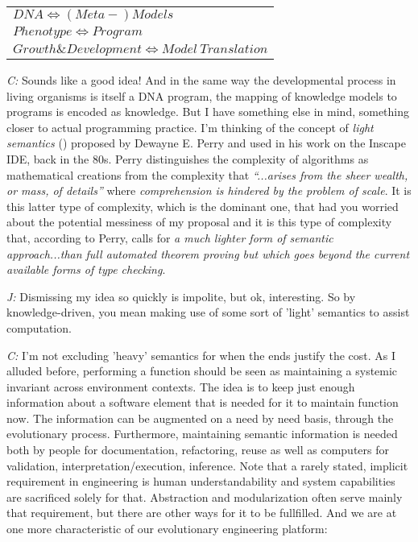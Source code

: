 \documentclass[10pt]{sigplanconf}
\begin{document}
\vspace{10pt}

\begin{tabular}{l}
$DNA \Longleftrightarrow (Meta-)Models$ \\
$Phenotype \Longleftrightarrow Program$ \\
$Growth\&Development \Longleftrightarrow Model~Translation$ \\
\end{tabular}

\vspace{10pt}

\emph{C:} Sounds like a good idea! And in the same way the developmental process in living organisms is itself a DNA program, the mapping of knowledge models to programs is encoded as knowledge. But I have something else in mind, something closer to actual programming practice. I'm thinking of the concept of \emph{light semantics} (\cite{perry1}) proposed by Dewayne E. Perry and used in his work on the Inscape IDE, back in the 80s. Perry distinguishes the complexity of algorithms as mathematical creations from the complexity that \emph{``...arises from the sheer wealth, or mass, of details''} where \emph{comprehension is hindered by the problem of scale}. It is this latter type of complexity, which is the dominant one, that had you worried about the potential messiness of my proposal and it is this type of complexity that, according to Perry, calls for \emph{a much lighter form of semantic approach...than full automated theorem proving but which goes beyond the current available forms of type checking}.

\emph{J:} Dismissing my idea so quickly is impolite, but ok, interesting. So by knowledge-driven, you mean making use of some sort of 'light' semantics to assist computation.

\emph{C:} I'm not excluding 'heavy' semantics for when the ends justify the cost. As I alluded before, performing a function should be seen as maintaining a systemic invariant across environment contexts. The idea is to keep just enough information about a software element that is needed for it to maintain function now. The information can be augmented on a need by need basis, through the evolutionary process. Furthermore, maintaining semantic information is needed both by people for documentation, refactoring, reuse as well as computers for validation, interpretation/execution, inference. Note that a rarely stated, implicit requirement in engineering is human understandability and system capabilities are sacrificed solely for that. Abstraction and modularization often serve mainly that requirement, but there are other ways for it to be fullfilled. And we are at one more characteristic of our evolutionary engineering platform:
\end{document}
